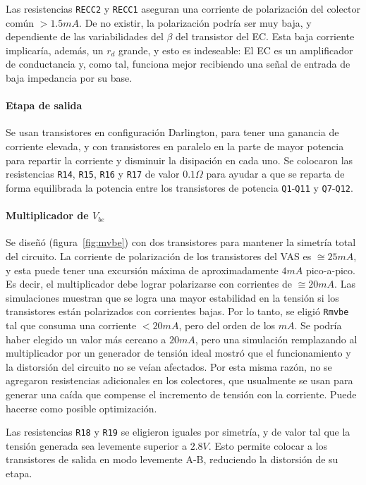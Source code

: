 \documentclass[a4paper,12pt,twoside]{article}
\begin{document}
Las resistencias \texttt{RECC2} y \texttt{RECC1} aseguran una corriente de polarización del colector común $>1.5mA$. De no existir, la polarización podría ser muy baja, y dependiente de las variabilidades del $\beta$ del transistor del EC. Esta baja corriente implicaría, además, un $r_d$ grande, y esto es indeseable: El EC es un amplificador de conductancia y, como tal, funciona mejor recibiendo una señal de entrada de baja impedancia por su base.


\paragraph{Etapa de salida}

Se usan transistores en configuración Darlington, para tener una ganancia de corriente elevada, y con transistores en paralelo en la parte de mayor potencia para repartir la corriente y disminuir la disipación en cada uno. Se colocaron las resistencias \texttt{R14}, \texttt{R15}, \texttt{R16} y \texttt{R17} de valor $0.1\Omega$ para ayudar a que se reparta de forma equilibrada la potencia entre los transistores de potencia \texttt{Q1}-\texttt{Q11} y \texttt{Q7}-\texttt{Q12}.


\paragraph{Multiplicador de $V_{be}$}


Se diseñó (figura~\ref{fig:mvbe}) con dos transistores para mantener la simetría total del circuito. La corriente de polarización de los transistores del VAS es $\cong 25mA$, y esta puede tener una excursión máxima de aproximadamente $4mA$ pico-a-pico. Es decir, el multiplicador debe lograr polarizarse con corrientes de $\cong 20mA$. Las simulaciones muestran que se logra una mayor estabilidad en la tensión si los transistores están polarizados con corrientes bajas. Por lo tanto, se eligió \texttt{Rmvbe} tal que consuma una corriente $<20mA$, pero del orden de los $mA$. Se podría haber elegido un valor más cercano a $20mA$, pero una simulación remplazando al multiplicador por un generador de tensión ideal mostró que el funcionamiento y la distorsión del circuito no se veían afectados. Por esta misma razón, no se agregaron resistencias adicionales en los colectores, que usualmente se usan para generar una caída que compense el incremento de tensión con la corriente. Puede hacerse como posible optimización.

Las resistencias \texttt{R18} y \texttt{R19} se eligieron iguales por simetría, y de valor tal que la tensión generada sea levemente superior a $2.8V$. Esto permite colocar a los transistores de salida en modo levemente A-B, reduciendo la distorsión de su etapa.
\end{document}
